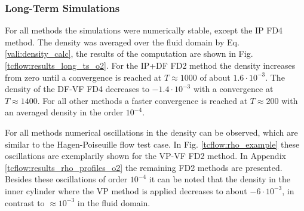 \clearpage

\subsubsection{Long-Term Simulations}

For all methods the simulations were numerically stable, except the IP FD4 method.
The density was averaged over the fluid domain by Eq. \ref{vali:density_calc},
the results of the computation are shown in Fig. \ref{tcflow:results_long_ts_o2}.
For the IP+DF FD2 method the density increases from zero until a convergence is reached at $T\approx 1000$ of about $1.6\cdot10^{-3}$.
The density of the  DF-VF FD4 decreases to $-1.4\cdot10^{-3}$ with a convergence at $T\approx1400$.
For all other methods a faster convergence is reached at $T\approx200$ with an  averaged density in the order $10^{-4}$.

For all methods numerical oscillations in the density can be
observed, which  are similar to the Hagen-Poiseuille flow test case.
In Fig. \ref{tcflow:rho_example} these oscillations are exemplarily shown for the VP-VF FD2 method.
In Appendix \ref{tcflow:results_rho_profiles_o2} the remaining FD2 methods are presented.
Besides these oscillations of order $10^{-4}$ it can be noted that the density in the inner cylinder
where the VP method is applied decreases to about $-6\cdot10^{-3}$, in contrast to $\approx10^{-3}$ in the fluid domain.

